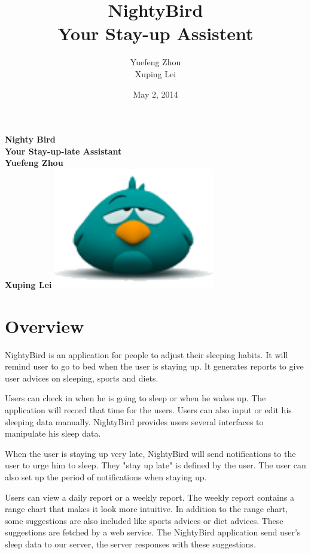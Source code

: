 \documentclass[14pt]{extreport}
\begin{document}
\title{NightyBird\\Your Stay-up Assistent}
\doublespacing

\author{Yuefeng Zhou\\Xuping Lei}
\date{May 2, 2014}

\begin{titlepage}
    \centering
    \vfill
    {\bfseries\Large
        Nighty Bird\\
        Your Stay-up-late Assistant\\
        \vskip2cm
        Yuefeng Zhou\\
        Xuping Lei
    }    
    \vfill
    \includegraphics[width=7cm]{icon.png} %
    \vfill
    \vfill
\end{titlepage}

\chapter{Overview}
NightyBird is an application for people to adjust their sleeping habits. It will remind user to go to bed when the user is staying up. It generates reports to give user advices on sleeping, sports and diets.

Users can check in when he is going to sleep or when he wakes up. The application will record that time for the users. Users can also input or edit his sleeping data manually. NightyBird provides users several interfaces to manipulate his sleep data. 

When the user is staying up very late, NightyBird will send notifications to the user to urge him to sleep. They "stay up late" is defined by the user. The user can also set up the period of notifications when staying up.

Users can view a daily report or a weekly report. The weekly report contains a range chart that makes it look more intuitive. In addition to the range chart, some suggestions are also included like sports advices or diet advices. These suggestions are fetched by a web service. The NightyBird application send user's sleep data to our server, the server responses with these suggestions.
\end{document}
